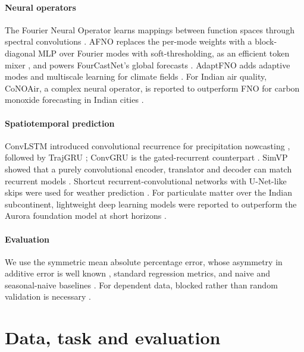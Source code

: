 \documentclass[10pt]{article}
\begin{document}
\paragraph{Neural operators}
The Fourier Neural Operator learns mappings between function spaces through spectral convolutions \citep{li2021fno}. AFNO replaces the per-mode weights with a block-diagonal MLP over Fourier modes with soft-thresholding, as an efficient token mixer \citep{guibas2022afno}, and powers FourCastNet's global forecasts \citep{pathak2022fourcastnet}. AdaptFNO adds adaptive modes and multiscale learning for climate fields \citep{dang2025adaptfno}. For Indian air quality, CoNOAir, a complex neural operator, is reported to outperform FNO for carbon monoxide forecasting in Indian cities \citep{bedi2025conoair}.

\paragraph{Spatiotemporal prediction}
ConvLSTM introduced convolutional recurrence for precipitation nowcasting \citep{shi2015convlstm}, followed by TrajGRU \citep{shi2017trajgru}; ConvGRU is the gated-recurrent counterpart \citep{ballas2016convgru}. SimVP showed that a purely convolutional encoder, translator and decoder can match recurrent models \citep{gao2022simvp}. Shortcut recurrent-convolutional networks with U-Net-like skips were used for weather prediction \citep{leinonen2021}. For particulate matter over the Indian subcontinent, lightweight deep learning models were reported to outperform the Aurora foundation model at short horizons \citep{kushwaha2025}.

\paragraph{Evaluation}
We use the symmetric mean absolute percentage error, whose asymmetry in additive error is well known \citep{goodwin1999}, standard regression metrics, and naive and seasonal-naive baselines \citep{hyndman2021}. For dependent data, blocked rather than random validation is necessary \citep{roberts2017}.

\section{Data, task and evaluation}
\label{sec:data}
\end{document}
